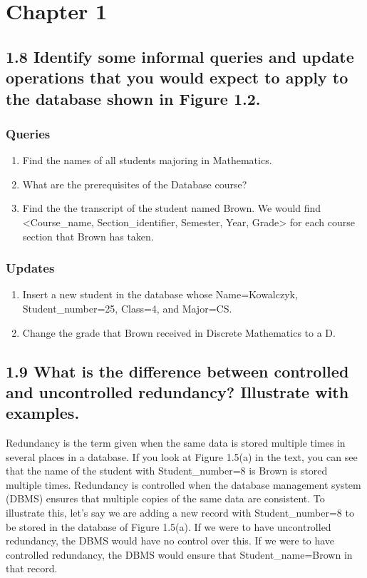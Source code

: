 \section*{Chapter 1}
\subsection*{1.8 Identify some informal queries and update operations that you would expect to apply to the database shown in Figure 1.2.}

\subsubsection*{Queries}

\begin{enumerate}
\item Find the names of all students majoring in Mathematics.
\item What are the prerequisites of the Database course?
\item Find the the transcript of the student named Brown. We would find <Course\_name, Section\_identifier, Semester, Year, Grade> for each course section that Brown has taken.
\end{enumerate}

\subsubsection*{Updates}

\begin{enumerate}
\item Insert a new student in the database whose Name=Kowalczyk, Student\_number=25, Class=4, and Major=CS.
\item Change the grade that Brown received in Discrete Mathematics to a D.
\end{enumerate}

\subsection*{1.9 What is the difference between controlled and uncontrolled redundancy? Illustrate with examples.}
Redundancy is the term given when the same data is stored multiple times in several places in a database. If you look at Figure 1.5(a)  in the text, you can see that the name of the student with Student\_number=8 is Brown is stored multiple times. Redundancy is controlled when the database management system (DBMS) ensures that multiple copies of the same data are consistent. To illustrate this, let's say we are adding a new record with Student\_number=8 to be stored in the database of Figure 1.5(a). If we were to have uncontrolled redundancy, the DBMS would have no control over this. If we were to have controlled redundancy, the DBMS would ensure that Student\_name=Brown in that record.

